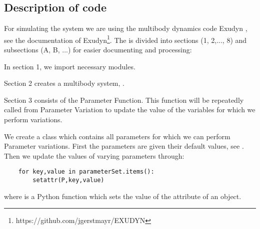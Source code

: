 \subsection{Description of code}
For simulating the system we are using the multibody dynamics code Exudyn \cite{Gerstmayr2022}, see the documentation of Exudyn\footnote{https://github.com/jgerstmayr/EXUDYN}.
%
The  is divided into sections (1, 2,..., 8) and subsections (A, B, ...) for easier documenting and processing: %
\bi 
\item{In section 1, we import necessary modules.}
\item{Section 2 creates a multibody system, .}
\item{Section 3 consists of the Parameter Function. This function will be repeatedly called from Parameter Variation to update the value of the variables for which we perform variations.} 
\bi
\item{
We create a class  which contains all parameters for which we can perform Parameter variations. First the parameters are given their default values, see . Then we update the values of varying parameters through:
\pythonstyle
\begin{lstlisting}
	for key,value in parameterSet.items():
		setattr(P,key,value)
\end{lstlisting}		
where  is a Python function which sets the value of the attribute of an object.}
%
